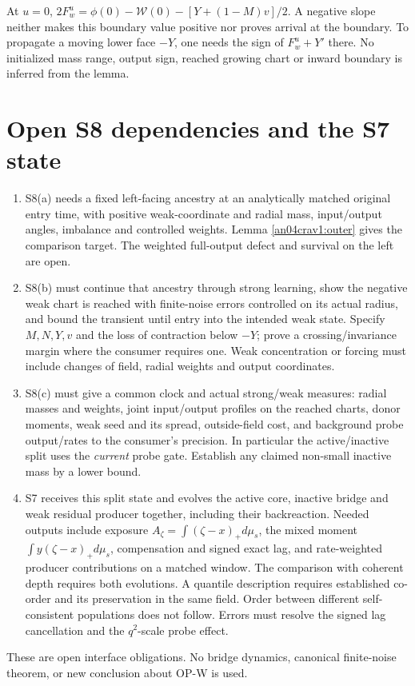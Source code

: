 \documentclass[11pt]{article}
\begin{document}
At \(u=0\), \(2F_w^u=\phi(0)-\mathcal W(0)-[Y+(1-M)v]/2\).
A negative slope neither makes this boundary value positive nor proves
arrival at the boundary. To propagate a moving lower face \(-Y\),
one needs the sign of \(F_w^u+Y'\) there. No initialized mass range,
output sign, reached growing chart or inward boundary is inferred from
the lemma.

\section{Open S8 dependencies and the S7 state}\label{an04crav1:handoff}
\begin{enumerate}
\item S8(a) needs a fixed left-facing ancestry at an analytically
matched original entry time, with positive weak-coordinate and radial
mass, input/output angles, imbalance and controlled weights.
Lemma \ref{an04crav1:outer} gives the comparison target.
The weighted full-output defect and survival on the left are open.
\item S8(b) must continue that ancestry through strong learning,
show the negative weak chart is reached with finite-noise errors
controlled on its actual radius, and bound the transient until
entry into the intended weak state. Specify \(M,N,Y,v\) and the
loss of contraction below \(-Y\); prove a crossing/invariance margin
where the consumer requires one. Weak concentration or forcing must
include changes of field, radial weights and output coordinates.
\item S8(c) must give a common clock and actual strong/weak measures:
radial masses and weights, joint input/output profiles on the reached
charts, donor moments, weak seed and its spread, outside-field
cost, and background probe output/rates to the consumer's precision.
In particular the active/inactive split uses the \emph{current} probe
gate. Establish any claimed non-small inactive mass by a lower bound.
\item S7 receives this split state and evolves the active core, inactive
bridge and weak residual producer together, including their backreaction.
Needed outputs include exposure \(A_\zeta=\int(\zeta-x)_+d\mu_s\),
the mixed moment \(\int y(\zeta-x)_+d\mu_s\), compensation and signed
exact lag, and rate-weighted producer contributions on a matched window.
The comparison with coherent depth requires both evolutions. A quantile
description requires established co-order and its preservation in the
same field. Order between different self-consistent populations does
not follow. Errors must resolve the signed lag cancellation and the
\(q^2\)-scale probe effect.
\end{enumerate}
These are open interface obligations. No bridge dynamics, canonical
finite-noise theorem, or new conclusion about OP-W is used.
\end{document}
